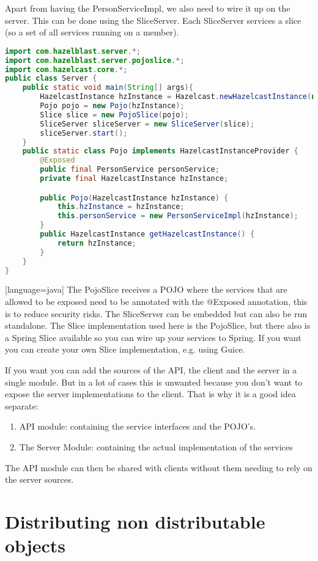 Apart from having the PersonServiceImpl, we also need to wire it up on the server. This can be done using the SliceServer. Each SliceServer services a slice (so a set of all services running on a member).
\begin{lstlisting}[language=java]
import com.hazelblast.server.*;
import com.hazelblast.server.pojoslice.*;
import com.hazelcast.core.*;
public class Server {
    public static void main(String[] args){
        HazelcastInstance hzInstance = Hazelcast.newHazelcastInstance(null);
        Pojo pojo = new Pojo(hzInstance);
        Slice slice = new PojoSlice(pojo);
        SliceServer sliceServer = new SliceServer(slice);
        sliceServer.start();
    }
    public static class Pojo implements HazelcastInstanceProvider {
        @Exposed
        public final PersonService personService;
        private final HazelcastInstance hzInstance;

        public Pojo(HazelcastInstance hzInstance) {
            this.hzInstance = hzInstance;
            this.personService = new PersonServiceImpl(hzInstance);
        }
        public HazelcastInstance getHazelcastInstance() {
            return hzInstance;
        }
    }
}
\end{lstlisting}[language=java]
The PojoSlice receives a POJO where the services that are allowed to be exposed need to be annotated with the @Exposed annotation, this is to reduce security risks. The SliceServer can be embedded but can also be run standalone. The Slice implementation used here is the PojoSlice, but there also is a Spring Slice available so you can wire up your services to Spring. If you want you can create your own Slice implementation, e.g. using Guice.

If you want you can add the sources of the API, the client and the server in a single module. But in a lot of cases this is unwanted because you don't want to expose the server implementations to the client. That is why it is a good idea separate:
\begin{enumerate}
\item API module: containing the service interfaces and the POJO's.
\item The Server Module: containing the actual implementation of the services
\end{enumerate}
The API module can then be shared with clients without them needing to rely on the server sources.

\section{Distributing non distributable objects}

